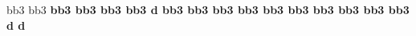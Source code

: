 
%
%
\def\freqbarno{9999}
%
\ifx\medleyflag\relax\else
  \nopagenumbers{}\medtall\medwidewidth\fi
\newpitch\newgrace\noautoglue
%
\relax
%
%
%
\debutmorceau
{}%
\leftrepeatsymbol
\notes\grg\qla\taor\ca\etn
\grg\bscc bb3{\ba\grd}{\bNp\grd}\ba\enotes\xbarre
\notes\thrwd\qld\ce\etn
\dblf\qlf\ch\enotes\xbarre
\notes\grf\qlg\ce\etn
\dblf\qlf\cd\enotes\xbarre
\notes\grg\bcsc bb3\bep\bf\bd\etn
\grg\bcsc bb3\bbp\bc\bd\enotes\suspmorceau
%
\reprmorceau
\notes\grg\qla\taor\ca\etn
\grg\bscc bb3{\ba\grd}{\bNp\grd}\ba\enotes\xbarre
\notes\thrwd\qld\ce\etn
\grg\qlf\dblg\cg\enotes\xbarre
\notes\bcsc bb3\bhp\bf\bd\etn
\grg\bscc bb3\be{\bfp\grg}\be\enotes\xbarre
\notes\thrwd\qlp d\etn
{}\slurd\bcsc bb3\bdp\bc\bb\rlap{\fsk\Uptext{$\vert$}}\etn
{}\slurd\qld\rlap{\fsk\Uptext{$\vert$}}\enotes\setrightrepeat\suspmorceau
%
\reprmorceau
\leftrepeatsymbol
\notes\grg\bts bb3\be\bfp\enotes\xbarre
\notes\dblg\qlg\grip\cg\etn
\grf\bcsc bb3\bgp\bh\bg\enotes\xbarre
\notes\grh\qlf\grip\cf\etn
\grg\bscc bb3\bf\bhp\bf\enotes\xbarre
\notes\grg\qle\grip\ce\etn
\grg\bcsc bb3\bep\bf\bg\enotes\xbarre
\notes\grh\bcsc bb3\bfp\be\bd\etn
\grg\bcss bb3\bbp\bc\bd\enotes\suspmorceau
%
\reprmorceau
\notes\grg\qla\taor\ca\etn
\grg\bscc bb3{\ba\grd}{\bNp\grd}\ba\enotes\xbarre
\notes\thrwd\qld\ce\etn
\grg\qlf\dblg\cg\enotes\xbarre
\notes\bcsc bb3\bhp\bf\bd\etn
\grg\bscc bb3\be{\bfp\grg}\be\enotes\xbarre
\notes\thrwd\qlp d\etn
{}\slurd\qld\rlap{\fsk\Uptext{$\vert$}}\etn
{}\slurd\qlp d\rlap{\fsk\Uptext{$\vert$}}\enotes\setrightrepeat\suspmorceau\byemedley
\bye

